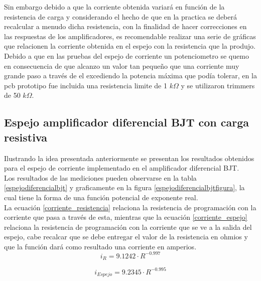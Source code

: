 Sin embargo debido a que la corriente obtenida variará en función de la resistencia de carga y considerando el hecho de que en la practica se deberá recalcular a menudo dicha resistencia, con la finalidad de hacer correcciones en las respuestas de los amplificadores, es recomendable realizar una serie de gráficas que relacionen la corriente obtenida en el espejo con la resistencia que la produjo.\\

Debido a que en las pruebas del espejo de corriente un potenciometro se quemo en consecuencia de que alcanzo un valor tan pequeño que una corriente muy grande paso a través de el excediendo la potencia máxima que podía tolerar, en la pcb prototipo fue incluida una resistencia limite de 1 $k\Omega$ y se utilizaron trimmers de 50 $k\Omega$.
\subsection{Espejo amplificador diferencial BJT con carga resistiva}
Ilustrando la idea presentada anteriormente se presentan los resultados obtenidos para el espejo de corriente implementado en el amplificador diferencial BJT. \\

Los resultados de las mediciones pueden observarse en la tabla \ref{espejodiferencialbjt} y graficamente en la figura \ref{espejodiferencialbjtfigura}, la cual tiene la forma de una función potencial de exponente real. \\

La ecuación \ref{corriente_resistencia} relaciona la resistencia de programación con la corriente que pasa a través de esta, mientras que la ecuación \ref{corriente_espejo} relaciona la resistencia de programación con la corriente que se ve a la salida del espejo, cabe recalcar que se debe entregar el valor de la resistencia en ohmios y que la función dará como resultado una corriente en amperios. \\

\begin{equation}\label{corriente_resistencia}
i_R=9.1242\cdot R^{-0.997}
\end{equation}

\begin{equation}\label{corriente_espejo}
i_{Espejo}=9.2345\cdot R^{-0.995}
\end{equation}

